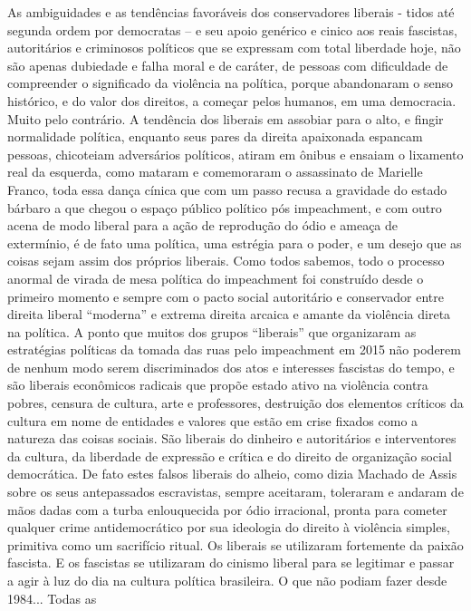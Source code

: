 As ambiguidades e as tendências favoráveis dos conservadores liberais -
tidos até segunda ordem por democratas -- e seu apoio genérico e cinico
aos reais fascistas, autoritários e criminosos políticos que se
expressam com total liberdade hoje, não são apenas dubiedade e falha
moral e de caráter, de pessoas com dificuldade de compreender o
significado da violência na política, porque abandonaram o senso
histórico, e do valor dos direitos, a começar pelos humanos, em uma
democracia. Muito pelo contrário. A tendência dos liberais em assobiar
para o alto, e fingir normalidade política, enquanto seus pares da
direita apaixonada espancam pessoas, chicoteiam adversários políticos,
atiram em ônibus e ensaiam o lixamento real da esquerda, como mataram e
comemoraram o assassinato de Marielle Franco, toda essa dança cínica que
com um passo recusa a gravidade do estado bárbaro a que chegou o espaço
público político pós impeachment, e com outro acena de modo liberal para
a ação de reprodução do ódio e ameaça de extermínio, é de fato uma
política, uma estrégia para o poder, e um desejo que as coisas sejam
assim dos próprios liberais. Como todos sabemos, todo o processo anormal
de virada de mesa política do impeachment foi construído desde o
primeiro momento e sempre com o pacto social autoritário e conservador
entre direita liberal ``moderna'' e extrema direita arcaica e amante da
violência direta na política. A ponto que muitos dos grupos ``liberais''
que organizaram as estratégias políticas da tomada das ruas pelo
impeachment em 2015 não poderem de nenhum modo serem discriminados dos
atos e interesses fascistas do tempo, e são liberais econômicos radicais
que propõe estado ativo na violência contra pobres, censura de cultura,
arte e professores, destruição dos elementos críticos da cultura em nome
de entidades e valores que estão em crise fixados como a natureza das
coisas sociais. São liberais do dinheiro e autoritários e interventores
da cultura, da liberdade de expressão e crítica e do direito de
organização social democrática. De fato estes falsos liberais do alheio,
como dizia Machado de Assis sobre os seus antepassados escravistas,
sempre aceitaram, toleraram e andaram de mãos dadas com a turba
enlouquecida por ódio irracional, pronta para cometer qualquer crime
antidemocrático por sua ideologia do direito à violência simples,
primitiva como um sacrifício ritual. Os liberais se utilizaram
fortemente da paixão fascista. E os fascistas se utilizaram do cinismo
liberal para se legitimar e passar a agir à luz do dia na cultura
política brasileira. O que não podiam fazer desde 1984... Todas as
